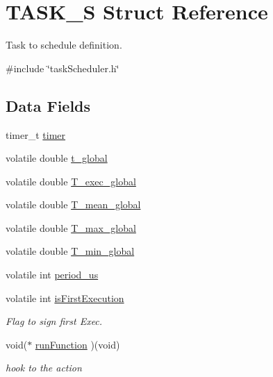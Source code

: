 \hypertarget{structTASK__S}{\section{T\-A\-S\-K\-\_\-\-S Struct Reference}
\label{structTASK__S}
}


Task to schedule definition.  




{\ttfamily \#include \char`\"{}task\-Scheduler.\-h\char`\"{}}

\subsection*{Data Fields}
\begin{DoxyCompactItemize}
\item 
timer\-\_\-t \hyperlink{structTASK__S_a17834f3d4f84241ccb4191f3cf7d7af3}{timer}
\item 
volatile double \hyperlink{structTASK__S_a29a175bdd4b9f880a2b69bb5186e3c7e}{t\-\_\-global}
\item 
volatile double \hyperlink{structTASK__S_ae06b712fd9963cff8192e9ef3140bc6d}{T\-\_\-exec\-\_\-global}
\item 
volatile double \hyperlink{structTASK__S_a9ebae87e1b64869f328a47473f2ea7d7}{T\-\_\-mean\-\_\-global}
\item 
volatile double \hyperlink{structTASK__S_a430c874cbf361b6dbc75ad1540880948}{T\-\_\-max\-\_\-global}
\item 
volatile double \hyperlink{structTASK__S_a07174e333a0013f4d51b30509b388f58}{T\-\_\-min\-\_\-global}
\item 
volatile int \hyperlink{structTASK__S_aabd8f80831e6cfd8e51bbd371eed907b}{period\-\_\-us}
\item 
volatile int \hyperlink{structTASK__S_a4b50404ee955691f1c62845cdc9de676}{is\-First\-Execution}
\begin{DoxyCompactList}\small\item\em Flag to sign first Exec. \end{DoxyCompactList}\item 
void($\ast$ \hyperlink{structTASK__S_a241d427891bed303812b78bd9f9ad86f}{run\-Function} )(void)
\begin{DoxyCompactList}\small\item\em hook to the action \end{DoxyCompactList}\end{DoxyCompactItemize}


